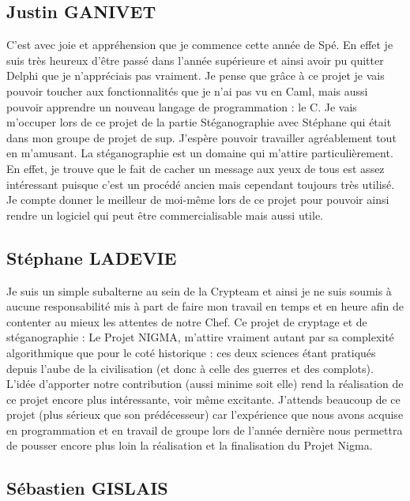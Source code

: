 \documentclass[a4paper,12pt]{article}
\begin{document}
\subsection{Justin GANIVET}

C’est avec joie et appréhension que je commence cette année de Spé. En effet je suis très heureux d’être passé dans l’année supérieure et ainsi avoir pu quitter Delphi que je  n’appréciais pas vraiment. Je pense que grâce à ce projet je vais pouvoir toucher aux fonctionnalités que je n’ai pas vu en Caml, mais aussi pouvoir apprendre un nouveau langage de programmation : le C. Je vais m’occuper lors de ce projet de la partie Stéganographie avec Stéphane qui était dans mon groupe de projet de sup. J’espère pouvoir travailler agréablement tout en m’amusant. La stéganographie est un domaine qui m’attire particulièrement. En effet, je trouve que le fait de cacher un message aux yeux de tous est assez intéressant puisque c’est un procédé ancien mais cependant toujours très utilisé. Je compte donner le meilleur de moi-même lors de ce projet pour pouvoir ainsi rendre un logiciel qui peut être commercialisable mais aussi utile.


\subsection{Stéphane LADEVIE}

Je suis un simple subalterne au sein de la Crypteam et ainsi je ne suis soumis à aucune responsabilité mis à part de faire mon travail en temps et en heure afin de contenter au mieux les attentes de notre Chef. Ce projet de cryptage et de stéganographie : Le Projet NIGMA, m’attire vraiment autant par sa complexité algorithmique que pour le coté historique : ces deux sciences étant pratiqués depuis l’aube de la civilisation (et donc à celle des guerres et des complots). L’idée d’apporter notre contribution (aussi minime soit elle) rend la réalisation de ce projet encore plus intéressante, voir même excitante.
J’attends beaucoup de ce projet (plus sérieux que son prédécesseur) car l’expérience que nous avons acquise en programmation et en travail de groupe lors de l’année dernière nous permettra de pousser encore plus loin la réalisation et la finalisation du Projet Nigma.

\subsection{Sébastien GISLAIS}

\newpage
\end{document}
